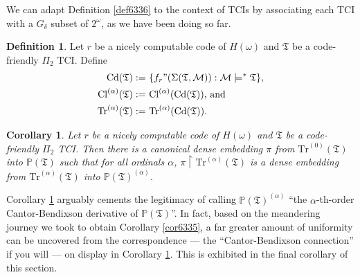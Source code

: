 \documentclass[12pt, twoside]{memoir}
\numberwithin{equation}{section}
\newtheorem{cor}[thm]{Corollary}
\theoremstyle{definition}
\newtheorem{defi}[thm]{Definition}
\theoremstyle{remark}
\theoremstyle{definition}
\theoremstyle{definition}
\theoremstyle{definition}
\theoremstyle{remark}
\begin{document}
We can adapt Definition \ref{def6336} to the context of TCIs by associating each TCI with a $G_{\delta}$ subset of $2^{\omega}$, as we have been doing so far.

\begin{defi}
Let $r$ be a nicely computable code of $H(\omega)$ and $\mathfrak{T}$ be a code-friendly $\Pi_2$ TCI. Define
\begin{align*}
    \mathrm{Cd}(\mathfrak{T}) := \ & \{f_r" (\Sigma(\mathfrak{T}, \mathcal{M})) : \mathcal{M} \models^* \mathfrak{T}\} \text{,} \\
    \mathrm{Cl}^{(\alpha)}(\mathfrak{T}) := \ & \mathrm{Cl}^{(\alpha)}(\mathrm{Cd}(\mathfrak{T})) \text{, and} \\
    \mathrm{Tr}^{(\alpha)}(\mathfrak{T}) := \ & \mathrm{Tr}^{(\alpha)}(\mathrm{Cd}(\mathfrak{T})) \text{.}    
\end{align*}
\end{defi}

\begin{cor}\label{cor6337}
Let $r$ be a nicely computable code of $H(\omega)$ and $\mathfrak{T}$ be a code-friendly $\Pi_2$ TCI. Then there is a canonical dense embedding $\pi$ from $\mathrm{Tr}^{(0)}(\mathfrak{T})$ into $\mathbb{P}(\mathfrak{T})$ such that for all ordinals $\alpha$, $\pi \restriction \mathrm{Tr}^{(\alpha)}(\mathfrak{T})$ is a dense embedding from $\mathrm{Tr}^{(\alpha)}(\mathfrak{T})$ into $\mathbb{P}(\mathfrak{T})^{(\alpha)}$.
\end{cor}

Corollary \ref{cor6337} arguably cements the legitimacy of calling $\mathbb{P}(\mathfrak{T})^{(\alpha)}$ ``the $\alpha$-th-order Cantor-Bendixson derivative of $\mathbb{P}(\mathfrak{T})$''. In fact, based on the meandering journey we took to obtain Corollary \ref{cor6335}, a far greater amount of uniformity can be uncovered from the correspondence --- the ``Cantor-Bendixson connection'' if you will --- on display in Corollary \ref{cor6337}. This is exhibited in the final corollary of this section.
\end{document}

